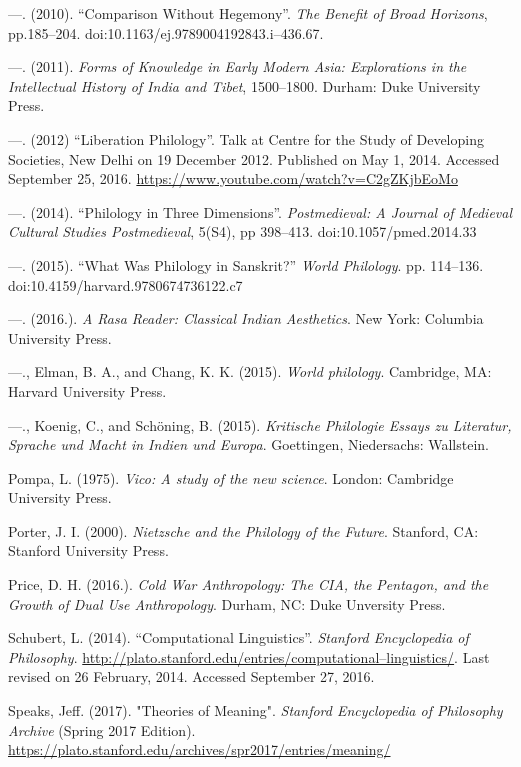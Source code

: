 \begin{thebibliography}{99}
  —. (2010). “Comparison Without Hegemony”. \textit{The Benefit of Broad Horizons}, pp.185–204. doi:10.1163/ej.9789004192843.i–436.67.

  —. (2011). \textit{Forms of Knowledge in Early Modern Asia: Explorations in the Intellectual History of India and Tibet}, 1500–1800. Durham: Duke University Press.

  —. (2012) “Liberation Philology”. Talk at Centre for the Study of Developing Societies, New Delhi on 19 December 2012. Published on May 1, 2014. Accessed September 25, 2016. \url{https://www.youtube.com/watch?v=C2gZKjbEoMo}

  —. (2014). “Philology in Three Dimensions”. \textit{Postmedieval: A Journal of Medieval Cultural Studies Postmedieval}, 5(S4), pp 398–413. doi:10.1057/pmed.2014.33

  —. (2015). “What Was Philology in Sanskrit?” \textit{World Philology}. pp. 114–136. doi:10.4159/harvard.9780674736122.c7

  —. (2016.). \textit{A Rasa Reader: Classical Indian Aesthetics}. New York: Columbia University Press.

  —., Elman, B. A., and Chang, K. K. (2015). \textit{World philology}. Cambridge, MA: Harvard University Press.

  —., Koenig, C., and Schöning, B. (2015). \textit{Kritische Philologie Essays zu Literatur, Sprache und Macht in Indien und Europa}. Goettingen, Niedersachs: Wallstein.

  Pompa, L. (1975). \textit{Vico: A study of the new science}. London: Cambridge University Press.

  Porter, J. I. (2000). \textit{Nietzsche and the Philology of the Future}. Stanford, CA: Stanford University Press.

  Price, D. H. (2016.). \textit{Cold War Anthropology: The CIA, the Pentagon, and the Growth of Dual Use Anthropology}. Durham, NC: Duke Unversity Press.

  Schubert, L. (2014). “Computational Linguistics”. \textit{Stanford Encyclopedia of Philosophy}. \url{http://plato.stanford.edu/entries/computational–linguistics/}. Last revised on 26 February, 2014. Accessed September 27, 2016.

  Speaks, Jeff. (2017). "Theories of Meaning". \textit{Stanford Encyclopedia of Philosophy Archive} (Spring 2017 Edition). \url{https://plato.stanford.edu/archives/spr2017/entries/meaning/}


\end{thebibliography}
